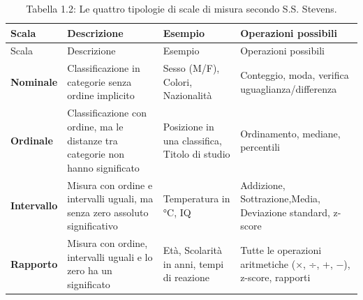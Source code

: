 \documentclass[
  italian,
  letterpaper,
  paper=6in:9in,
  pagesize=pdftex,
  headinclude=on,
  footinclude=on,
  11pt]{scrbook}
\begin{document}
\begingroup
{\scriptsize

\begin{longtable}[]{@{}
  >{\raggedright\arraybackslash}p{}
  >{\raggedright\arraybackslash}p{}
  >{\raggedright\arraybackslash}p{}
  >{\raggedright\arraybackslash}p{}@{}}
\caption{Tabella 1.2: Le quattro tipologie di scale di misura secondo
S.S. Stevens.}\tabularnewline
\toprule\noalign{}
\begin{minipage}[b]{\linewidth}\raggedright
Scala
\end{minipage} & \begin{minipage}[b]{\linewidth}\raggedright
Descrizione
\end{minipage} & \begin{minipage}[b]{\linewidth}\raggedright
Esempio
\end{minipage} & \begin{minipage}[b]{\linewidth}\raggedright
Operazioni possibili
\end{minipage} \\
\midrule\noalign{}
\endfirsthead
\toprule\noalign{}
\begin{minipage}[b]{\linewidth}\raggedright
Scala
\end{minipage} & \begin{minipage}[b]{\linewidth}\raggedright
Descrizione
\end{minipage} & \begin{minipage}[b]{\linewidth}\raggedright
Esempio
\end{minipage} & \begin{minipage}[b]{\linewidth}\raggedright
Operazioni possibili
\end{minipage} \\
\midrule\noalign{}
\endhead
\bottomrule\noalign{}
\endlastfoot
\textbf{Nominale} & Classificazione in categorie senza ordine implicito
& Sesso (M/F), Colori, Nazionalità & Conteggio, moda, verifica
uguaglianza/differenza \\
\textbf{Ordinale} & Classificazione con ordine, ma le distanze tra
categorie non hanno significato & Posizione in una classifica, Titolo di
studio & Ordinamento, mediane, percentili \\
\textbf{Intervallo} & Misura con ordine e intervalli uguali, ma senza
zero assoluto significativo & Temperatura in °C, IQ & Addizione,
Sottrazione,Media, Deviazione standard, z-score \\
\textbf{Rapporto} & Misura con ordine, intervalli uguali e lo zero ha un
significato & Età, Scolarità in anni, tempi di reazione & Tutte le
operazioni aritmetiche (×, ÷, +, −), z-score, rapporti \\
\end{longtable}

}
\end{document}
